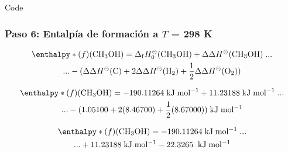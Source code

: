 \documentclass{beamer}
\begin{document}
\begin{frame}[fragile]{Code}
\frametitle{Paso 6: Entalpía de formación a $T$ = 298 K}

\begin{multline}
	\enthalpy*(f){}\mathrm{(CH_3OH)} = \mathrm{\Delta}_\mathrm{{f}} H^{\circleddash}_{0}\mathrm{(CH_{3}OH)} + \mathrm{\Delta \Delta} H^{\circleddash} \mathrm{(CH_{3}OH)}\;...\\ ...- (\mathrm{\Delta \Delta} H^{\circleddash} \mathrm{(C)} + 2 \mathrm{\Delta \Delta} H^{\circleddash}\mathrm{(H_{2})} + \mathrm{\frac{1}{2}} \mathrm{\Delta \Delta} H^{\circleddash}\mathrm{(O_{2}))}
\label{eq:4.16}
\end{multline}

\begin{multline}
	\enthalpy*(f){}\mathrm{(CH_3OH)} = \mathrm{-190.11264}\;\mathrm{kJ\;mol^{-1}} + \mathrm{11.23188}\;\mathrm{kJ\;mol^{-1}}\;...  \\ ...- \mathrm{(1.05100 + 2(8.46700) + \frac{1}{2} (8.67000))}\mathrm{\; kJ\;mol^{-1}}
\label{eq:4.17}
\end{multline}

\begin{multline}
	\enthalpy*(f){}\mathrm{(CH_3OH)} = -190.11264\;\mathrm{kJ\;mol^{-1}}\;... \\...+ 11.23188\;\mathrm{kJ\;mol^{-1}} - 22.3265\;\mathrm{\; kJ\;mol^{-1}}
\label{eq:4.18}
\end{multline}
\end{frame}
\end{document}
